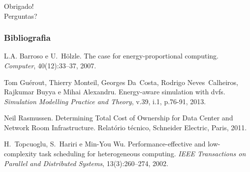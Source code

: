 \documentclass{beamer}
\begin{document}
\begin{frame}
\frametitle{}

\begin{center}
	\Huge Obrigado! \\
	\Large Perguntas?
\end{center}

\end{frame}

\begin{frame}
\frametitle{Bibliografia}


\begin{thebibliography}{99}
	\small
	L.A. Barroso e U.~H\"olzle.
	The case for energy-proportional computing.
	{\em Computer}, 40(12):33--37, 2007.

	Tom Gu{\'e}rout, Thierry Monteil, Georges Da~Costa, Rodrigo Neves~Calheiros,
	  Rajkumar Buyya e Mihai Alexandru.
	Energy-aware simulation with dvfs.
	{\em Simulation Modelling Practice and Theory}, v.39, i.1, p.76-91, 2013.

	Neil Rasmussen.
	Determining Total Cost of Ownership for Data Center and Network Room
	  Infrastructure.
	Relat{\'o}rio t{\'e}cnico, Schneider Electric, Paris, 2011.

	H.~Topcuoglu, S.~Hariri e Min-You Wu.
	Performance-effective and low-complexity task scheduling for
	  heterogeneous computing.
	{\em IEEE Transactions on Parallel and Distributed Systems},
	  13(3):260--274, 2002.

\end{thebibliography}

\end{frame}

\begin{frame}
	\titlepage
\end{frame}

\appendix
\end{document}
